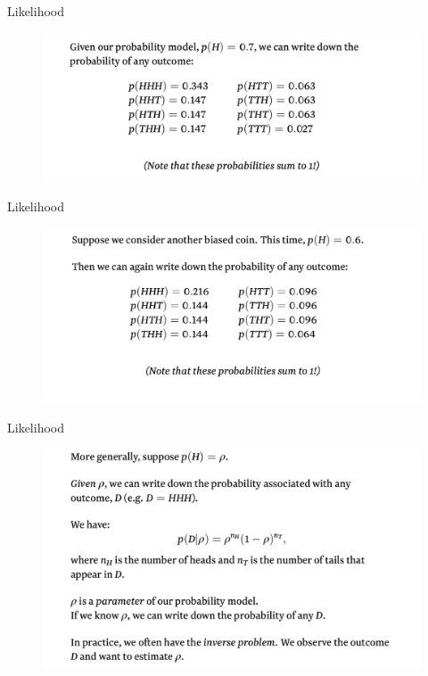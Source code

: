 \documentclass{beamer}
\begin{document}
\begin{frame}{Likelihood}

        \begin{figure}
                \includegraphics[width=\linewidth]{like2.png}
        \end{figure}

\end{frame}
\begin{frame}{Likelihood}

        \begin{figure}
                \includegraphics[width=\linewidth]{like3.png}
        \end{figure}

\end{frame}
\begin{frame}{Likelihood}

        \begin{figure}
                \includegraphics[width=\linewidth]{like4.png}
        \end{figure}

\end{frame}
\end{document}
